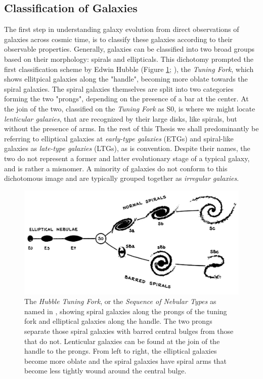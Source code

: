 \subsection{Classification of Galaxies}

The first step in understanding galaxy evolution from direct observations of galaxies across cosmic time, is to classify these galaxies according to their observable properties. Generally, galaxies can be classified into two broad groups based on their morphology: spirals and ellipticals. This dichotomy prompted the first classification scheme by Edwin Hubble (Figure \ref{fig:hubble_tuning_fork}; \citealt{Hubble_1936}), the \textit{Tuning Fork}, which shows ellitpical galaxies along the "handle", becoming more oblate towards the spiral galaxies. The spiral galaxies themselves are split into two categories forming the two "prongs", depending on the presence of a bar at the center. At the join of the two, classified on the \textit{Tuning Fork} as S0, is where we might locate \textit{lenticular galaxies}, that are recognized by their large disks, like spirals, but without the presence of arms. In the rest of this Thesis we shall predominantly be referring to elliptical galaxies at \textit{early-type galaxies} (ETGs) and spiral-like galaxies as \textit{late-type galaxies} (LTGs), as is convention. Despite their names, the two do not represent a former and latter evolutionary stage of a typical galaxy, and is rather a misnomer. A minority of galaxies do not conform to this dichotomous image and are typically grouped together as \textit{irregular galaxies}.

\begin{figure}
    \centering
	\includegraphics[width=0.9\columnwidth]{Figures/hubble_tuning_fork.pdf}
	\caption[The \textit{Hubble Tuning Fork}]{The \textit{Hubble Tuning Fork}, or the \textit{Sequence of Nebular Types} as named in \citealt{Hubble_1936}, showing spiral galaxies along the prongs of the tuning fork and elliptical galaxies along the handle. The two prongs separate those spiral galaxies with barred central bulges from those that do not. Lenticular galaxies can be found at the join of the handle to the prongs. From left to right, the elliptical galaxies become more oblate and the spiral galaxies have spiral arms that become less tightly wound around the central bulge.}
	\label{fig:hubble_tuning_fork}
\end{figure}

